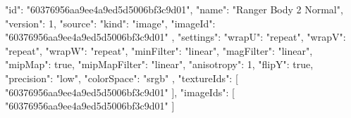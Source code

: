 {
  "id": "60376956aa9ee4a9ed5d5006bf3c9d01",
  "name": "Ranger Body 2 Normal",
  "version": 1,
  "source": {
    "kind": "image",
    "imageId": "60376956aa9ee4a9ed5d5006bf3c9d01"
  },
  "settings": {
    "wrapU": "repeat",
    "wrapV": "repeat",
    "wrapW": "repeat",
    "minFilter": "linear",
    "magFilter": "linear",
    "mipMap": true,
    "mipMapFilter": "linear",
    "anisotropy": 1,
    "flipY": true,
    "precision": "low",
    "colorSpace": "srgb"
  },
  "textureIds": [
    "60376956aa9ee4a9ed5d5006bf3c9d01"
  ],
  "imageIds": [
    "60376956aa9ee4a9ed5d5006bf3c9d01"
  ]
}

